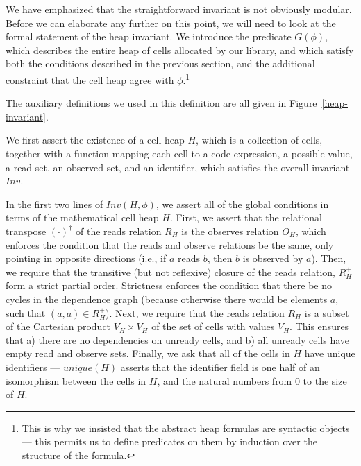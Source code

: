 We have emphasized that the straightforward invariant is not obviously
modular. Before we can elaborate any further on this point, we will
need to look at the formal statement of the heap invariant. We
introduce the predicate $G(\phi)$, which describes the entire heap of
cells allocated by our library, and which satisfy both the conditions
described in the previous section, and the additional constraint that
the cell heap agree with $\phi$.\footnote{This is why we insisted that
  the abstract heap formulas are syntactic objects --- this permits us
  to define predicates on them by induction over the structure of the
formula.}



The auxiliary definitions we used in this definition are all given in
Figure~\ref{heap-invariant}. 

We first assert the existence of a cell heap $H$, which is a
collection of cells, together with a function mapping each cell to a
code expression, a possible value, a read set, an observed set, and an
identifier, which satisfies the overall invariant $Inv$.

In the first two lines of $Inv(H, \phi)$, we assert all of the global 
conditions in terms of the mathematical cell heap $H$. First, we assert that 
the relational transpose $(\cdot)^\dagger$ of the reads relation $R_H$ is the
observes relation $O_H$, which enforces the condition that the reads
and observe relations be the same, only pointing in opposite
directions (i.e., if $a$ reads $b$, then $b$ is observed by
$a$). Then, we require that the transitive (but not reflexive) closure
of the reads relation, $R^+_H$ form a strict partial order. Strictness
enforces the condition that there be no cycles in the dependence graph
(because otherwise there would be elements $a$, such that $(a, a) \in
R^+_H$).  Next, we require that the reads relation $R_H$ is a subset of
the Cartesian product $V_H \times V_H$ of the set of cells with values
$V_H$. This ensures that a) there are no dependencies on unready
cells, and b) all unready cells have empty read and observe
sets. Finally, we ask that all of the cells in $H$ have unique
identifiers --- $unique(H)$ asserts that the identifier field is one
half of an isomorphism between the cells in $H$, and the natural
numbers from 0 to the size of $H$.

